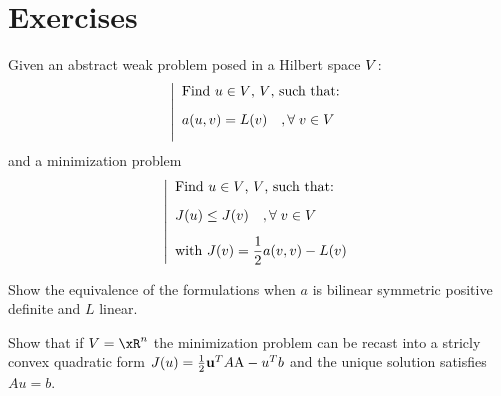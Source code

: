 \newpage

\section{Exercises}

\begin{xrcs}
Given an abstract weak problem posed in a Hilbert space ${V}$:
\begin{equation*}
\left\lvert
\begin{array}{ll}
\mbox{Find $u \in {V}$, ${V}$, such that:}\\[2ex]
a( u, v ) = L(v)\quad,{\forall\;}  v \in {V}\\[2ex]
\end{array}
\right .
\end{equation*}
and a minimization problem
\begin{equation*}
\left\lvert
\begin{array}{ll}
\mbox{Find $u \in {V}$, ${V}$, such that:}\\[2ex]
J(u) \leq J(v)\quad,{\forall\;}  v \in {V}\\[2ex]
\mbox{with $J(v) = \displaystyle\frac{1}{2} a(v,v) - L(v)$}
\end{array}
\right .
\end{equation*}
\begin{tmatsks}
\item Show the equivalence of the formulations when $a$ is bilinear symmetric positive definite and $L$ linear.
\item Show that if $\xV = \xR^n$ the minimization problem can be recast into a stricly convex quadratic form $J(u) = \frac{1}{2} \mathbf u^T A {\mathrm A} - u^T b$ and the unique solution satisfies $A u = b$.
\end{tmatsks}
\end{xrcs}

